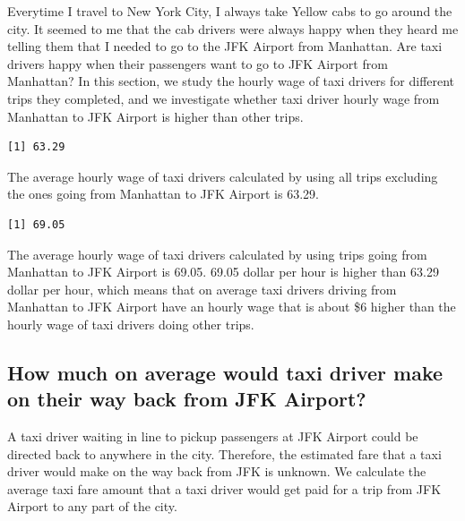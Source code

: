 \documentclass[12pt,twoside]{reedthesis}
\theoremstyle{definition}
\theoremstyle{definition}
\theoremstyle{definition}
\theoremstyle{remark}
\begin{document}
Everytime I travel to New York City, I always take Yellow cabs to go
around the city. It seemed to me that the cab drivers were always happy
when they heard me telling them that I needed to go to the JFK Airport
from Manhattan. Are taxi drivers happy when their passengers want to go
to JFK Airport from Manhattan? In this section, we study the hourly wage
of taxi drivers for different trips they completed, and we investigate
whether taxi driver hourly wage from Manhattan to JFK Airport is higher
than other trips.
\begin{verbatim}
[1] 63.29
\end{verbatim}
The average hourly wage of taxi drivers calculated by using all trips
excluding the ones going from Manhattan to JFK Airport is 63.29.
\begin{verbatim}
[1] 69.05
\end{verbatim}
The average hourly wage of taxi drivers calculated by using trips going
from Manhattan to JFK Airport is 69.05. 69.05 dollar per hour is higher
than 63.29 dollar per hour, which means that on average taxi drivers
driving from Manhattan to JFK Airport have an hourly wage that is about
\$6 higher than the hourly wage of taxi drivers doing other trips.

\subsection{How much on average would taxi driver make on their way back
from JFK
Airport?}\label{how-much-on-average-would-taxi-driver-make-on-their-way-back-from-jfk-airport}

A taxi driver waiting in line to pickup passengers at JFK Airport could
be directed back to anywhere in the city. Therefore, the estimated fare
that a taxi driver would make on the way back from JFK is unknown. We
calculate the average taxi fare amount that a taxi driver would get paid
for a trip from JFK Airport to any part of the city.
\end{document}
